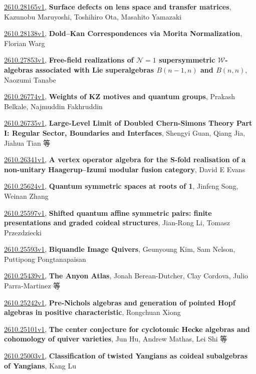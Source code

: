\documentclass[9pt, a4paper]{article}
\theoremstyle{plain}
\theoremstyle{definition}
\theoremstyle{remark}
\newcommand{\arxiv}[3]{\href{https://arxiv.org/abs/#1}{#1}, \textbf{\textcolor{arxivblue}{#2}}, #3}
\begin{document}
\arxiv{2610.28165v1}{Surface defects on lens space and transfer matrices}{Kazunobu Maruyoshi, Toshihiro Ota, Masahito Yamazaki}

\arxiv{2610.28138v1}{Dold--Kan Correspondences via Morita Normalization}{Florian Warg}

\arxiv{2610.27853v1}{Free-field realizations of $\mathcal{N} = 1$ supersymmetric $\mathcal{W}$-algebras associated with Lie superalgebras $B (n - 1 , n)$ and $B (n , n)$}{Naozumi Tanabe}

\arxiv{2610.26774v1}{Weights of KZ motives and quantum groups}{Prakash Belkale, Najmuddin Fakhruddin}

\arxiv{2610.26735v1}{Large-Level Limit of Doubled Chern-Simons Theory Part I: Regular Sector, Boundaries and Interfaces}{Shengyi Guan, Qiang Jia, Jiahua Tian 等}

\arxiv{2610.26341v1}{A vertex operator algebra for the S-fold realisation of a non-unitary Haagerup--Izumi modular fusion category}{David E Evans}

\arxiv{2610.25624v1}{Quantum symmetric spaces at roots of 1}{Jinfeng Song, Weinan Zhang}

\arxiv{2610.25597v1}{Shifted quantum affine symmetric pairs: finite presentations and graded coideal structures}{Jian-Rong Li, Tomasz Przezdziecki}

\arxiv{2610.25593v1}{Biquandle Image Quivers}{Geunyoung Kim, Sam Nelson, Puttipong Pongtanapaisan}

\arxiv{2610.25439v1}{The Anyon Atlas}{Jonah Berean-Dutcher, Clay Cordova, Julio Parra-Martinez 等}

\arxiv{2610.25242v1}{Pre-Nichols algebras and generation of pointed Hopf algebras in positive characteristic}{Rongchuan Xiong}

\arxiv{2610.25101v1}{The center conjecture for cyclotomic Hecke algebras and cohomology of quiver varieties}{Jun Hu, Andrew Mathas, Lei Shi 等}

\arxiv{2610.25003v1}{Classification of twisted Yangians as coideal subalgebras of Yangians}{Kang Lu}

\end{document}
